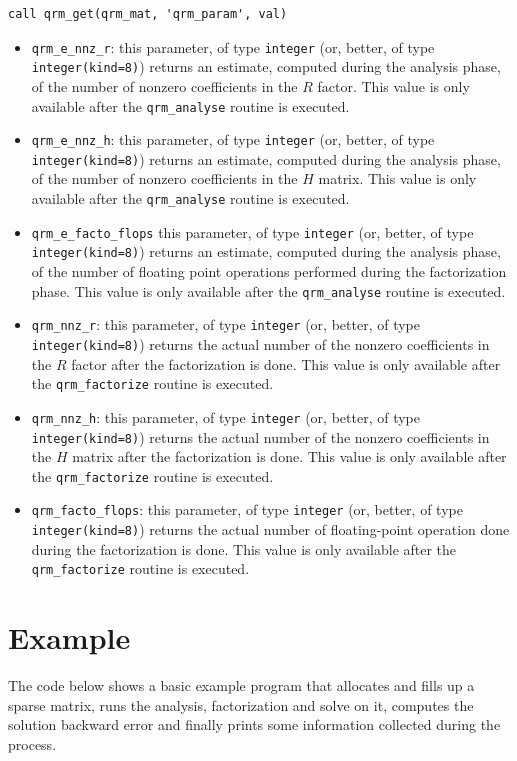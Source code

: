 \documentclass[11pt]{article}
\begin{document}
\begin{lstlisting}
call qrm_get(qrm_mat, 'qrm_param', val)
\end{lstlisting}

\begin{itemize}
\item \texttt{qrm\_e\_nnz\_r}: this parameter, of type \texttt{integer}
  (or, better, of type \texttt{integer(kind=8)}) returns an estimate,
  computed during the analysis phase, of the number of nonzero
  coefficients in the $R$ factor. This value is only available after the
  \texttt{qrm\_analyse} routine is executed.
\item \texttt{qrm\_e\_nnz\_h}: this parameter, of type \texttt{integer}
  (or, better, of type \texttt{integer(kind=8)}) returns an estimate,
  computed during the analysis phase, of the number of nonzero
  coefficients in the $H$ matrix. This value is only available after the
  \texttt{qrm\_analyse} routine is executed.
\item \texttt{qrm\_e\_facto\_flops} this parameter, of type
  \texttt{integer} (or, better, of type \texttt{integer(kind=8)})
  returns an estimate, computed during the analysis phase, of the
  number of floating point operations performed during the
  factorization phase. This value is only available after the
  \texttt{qrm\_analyse} routine is executed.
\item \texttt{qrm\_nnz\_r}: this parameter, of type \texttt{integer}
  (or, better, of type \texttt{integer(kind=8)}) returns the actual
  number of the nonzero coefficients in the $R$ factor after the
  factorization is done. This value is only available after the
  \texttt{qrm\_factorize} routine is executed.
\item \texttt{qrm\_nnz\_h}: this parameter, of type \texttt{integer}
  (or, better, of type \texttt{integer(kind=8)}) returns the actual
  number of the nonzero coefficients in the $H$ matrix after the
  factorization is done. This value is only available after the
  \texttt{qrm\_factorize} routine is executed.
\item \texttt{qrm\_facto\_flops}: this parameter, of type
  \texttt{integer} (or, better, of type \texttt{integer(kind=8)})
  returns the actual number of floating-point operation done during
  the factorization is done. This value is only available after the
  \texttt{qrm\_factorize} routine is executed.
\end{itemize}


\section{Example}

The code below shows a basic example program that allocates
and fills up a sparse matrix, runs the analysis, factorization and
solve on it, computes the solution backward error and finally prints
some information collected during the process.






\end{document}
